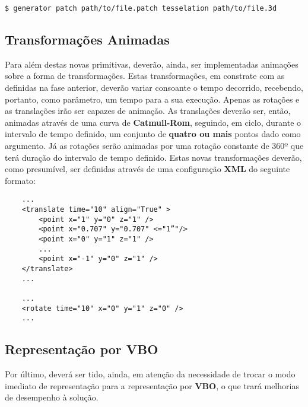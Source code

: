 \begin{lstlisting}[style=BASH]
    $ generator patch path/to/file.patch tesselation path/to/file.3d
\end{lstlisting}

\subsection{Transformações Animadas}
Para além destas novas primitivas, deverão, ainda,
ser implementadas animações sobre a forma de transformações.
\newline
\break
\noindent
Estas transformações, em constrate com as definidas na fase
anterior, deverão variar consoante o tempo decorrido, recebendo,
portanto, como parâmetro, um tempo para a sua execução.
Apenas as rotações e as translações irão ser capazes de
animação.
\newline
\break
\noindent
As translações deverão ser, então, animadas através de uma
curva de \textbf{Catmull-Rom}, seguindo, em ciclo, durante
o intervalo de tempo definido, um conjunto de \textbf{quatro
ou mais} pontos dado como argumento.
\newline
\break
\noindent
Já as rotações serão animadas por uma rotação constante de
360º que terá duração do intervalo de tempo definido.
\newline
\break
\noindent
Estas novas transformações deverão, como presumível, ser
definidas através de uma configuração \textbf{XML} do seguinte
formato:
\newline

\begin{tcolorbox}[
    colback=blue!10!white,
    colframe=black!50!black,
    after upper={\hfill\textbf{xml}}
]
\begin{verbatim}
    ...
    <translate time="10" align="True" >
        <point x="1" y="0" z="1" />
        <point x="0.707" y="0.707" <="1”"/>
        <point x="0" y="1" z="1" />
        ...
        <point x="-1" y="0" z="1" />
    </translate>
    ...

    ...
    <rotate time="10" x="0" y="1" z="0" />
    ...
\end{verbatim}
\end{tcolorbox}

\subsection{Representação por VBO}
Por último, deverá ser tido, ainda, em atenção
da necessidade de trocar o modo imediato de representação
para a representação por \textbf{VBO}, o que trará
melhorias de desempenho à solução.